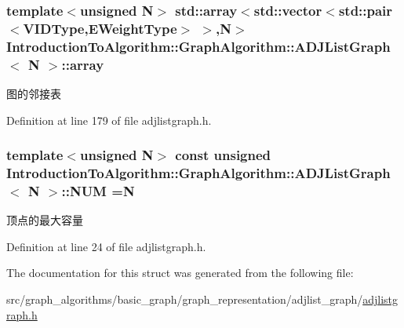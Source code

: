 \subsubsection[{array}]{\setlength{\rightskip}{0pt plus 5cm}template$<$unsigned N$>$ std\+::array$<$std\+::vector$<$std\+::pair$<${\bf V\+I\+D\+Type},{\bf E\+Weight\+Type}$>$ $>$,N$>$ {\bf Introduction\+To\+Algorithm\+::\+Graph\+Algorithm\+::\+A\+D\+J\+List\+Graph}$<$ N $>$\+::array}\label{struct_introduction_to_algorithm_1_1_graph_algorithm_1_1_a_d_j_list_graph_ac02abc1501b57a7963ec1b388150429e}
图的邻接表 

Definition at line 179 of file adjlistgraph.\+h.

\hypertarget{struct_introduction_to_algorithm_1_1_graph_algorithm_1_1_a_d_j_list_graph_aaff3f1cdb9f184027dd3f057d4a5b4bc}{}
\subsubsection[{N\+U\+M}]{\setlength{\rightskip}{0pt plus 5cm}template$<$unsigned N$>$ const unsigned {\bf Introduction\+To\+Algorithm\+::\+Graph\+Algorithm\+::\+A\+D\+J\+List\+Graph}$<$ N $>$\+::N\+U\+M =N\hspace{0.3cm}{\ttfamily [static]}}\label{struct_introduction_to_algorithm_1_1_graph_algorithm_1_1_a_d_j_list_graph_aaff3f1cdb9f184027dd3f057d4a5b4bc}
顶点的最大容量 

Definition at line 24 of file adjlistgraph.\+h.



The documentation for this struct was generated from the following file\+:\begin{DoxyCompactItemize}
\item 
src/graph\+\_\+algorithms/basic\+\_\+graph/graph\+\_\+representation/adjlist\+\_\+graph/\hyperlink{adjlistgraph_8h}{adjlistgraph.\+h}\end{DoxyCompactItemize}
